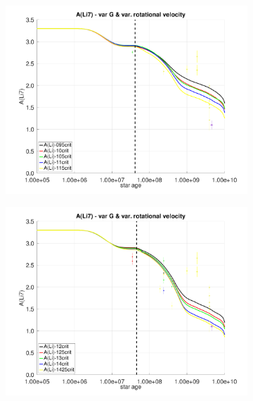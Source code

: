 \documentclass[fleqn,usenatbib]{mnras}
\begin{document}
\begin{figure}
    \centering
    \begin{subfigure}[h]{0.47\textwidth}
    \includegraphics[clip,width=\textwidth]{figures/paper2/li_var_vel_var_g_1.pdf}
    \label{fig:subim11}
    \end{subfigure}
    \begin{subfigure}[h]{0.47\textwidth}
    \includegraphics[clip,width=\textwidth]{figures/paper2/li_var_vel_var_g_3.pdf}
    \label{fig:subim12}
    \end{subfigure}
    \begin{subfigure}[h]{0.47\textwidth}

\end{subfigure}
\end{figure}
\end{document}
